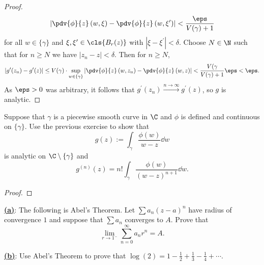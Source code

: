 \documentclass[12pt]{article}
\begin{document}
\begin{homeworkProblem}
\begin{proof}
    \[
      \left|\pdv{\phi}{z}\, (w,\xi) - \pdv{\phi}{z}\, (w,\xi^{\prime})\right| <\frac{\eps}{V(\gamma)+1}
    \]
    for all $ w\in \{\gamma\} $ and $ \xi,\xi^{\prime}\in \cls{B_{r}(z)} $ with $ | \xi-\xi^{\prime}| < \delta $. Choose $ N\in \N $ such that for $ n\geq N $ we have $ |z_{n}-z| < \delta $. Then for $ n\geq N $,
    \begin{align*}
      |g^{\prime}(z_{n})- g^{\prime}(z)| \leq V(\gamma) \cdot\sup_{w\in \{\gamma\}}\left|\pdv{\phi}{z}\, (w,z_{n}) - \pdv{\phi}{z}\, (w,z)\right| <\frac{V(\gamma}{V(\gamma)+1} \eps < \eps.
    \end{align*}
    As $ \eps>0 $ was arbitrary, it follows that $ g^{\prime}(z_{n})\xrightarrow{n\to\infty}g^{\prime}(z) $, so $ g $ is analytic.
  \end{proof}
\end{homeworkProblem}



\begin{homeworkProblem}
  Suppose that $ \gamma $ is a piecewise smooth curve in $ \C $ and $ \phi $ is defined and continuous on $ \{\gamma\} $. Use the previous exercise to show that 
  \[
    g(z) := \int_{\gamma}\frac{\phi(w)}{w-z}\dd{w}
  \]
  is analytic on $ \C\setminus\{\gamma\} $ and 
  \[
    g^{(n)}(z) = n!\int_{\gamma}\frac{\phi(w)}{(w-z)^{n+1}}\dd{w}.
  \]

  \begin{proof}
    
  \end{proof}
\end{homeworkProblem}



\begin{homeworkProblem}
  \underline{\textbf{(a)}}: The following is Abel's Theorem. Let $ \sum a_{n}(z-a)^{n} $ have radius of convergence $ 1 $ and suppose that $ \sum a_{n} $ converges to $ A $. Prove that 
  \[
    \lim_{r\to1^{-}} \sum_{n=0}^{\infty} a_{n}r^{n} = A.
  \]

  \underline{\textbf{(b)}}: Use  Abel's Theorem to prove that $ \log(2) = 1-\frac{1}{2}+\frac{1}{3} - \frac{1}{4}+\cdots$.
\end{homeworkProblem}
\end{document}
